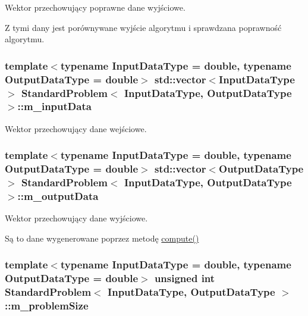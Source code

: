 Wektor przechowujący poprawne dane wyjściowe. 

Z tymi dany jest porównywane wyjście algorytmu i sprawdzana poprawność algorytmu. \hypertarget{class_standard_problem_ad1d5f039cd59372664a18ee57485252a}{
\subsubsection[{m\-\_\-input\-Data}]{\setlength{\rightskip}{0pt plus 5cm}template$<$typename Input\-Data\-Type = double, typename Output\-Data\-Type = double$>$ std\-::vector$<$Input\-Data\-Type$>$ {\bf Standard\-Problem}$<$ Input\-Data\-Type, Output\-Data\-Type $>$\-::m\-\_\-input\-Data\hspace{0.3cm}{\ttfamily [protected]}}}\label{class_standard_problem_ad1d5f039cd59372664a18ee57485252a}


Wektor przechowujący dane wejściowe. 

\hypertarget{class_standard_problem_a2ca81280f88e1d8091cacceae8f2e073}{
\subsubsection[{m\-\_\-output\-Data}]{\setlength{\rightskip}{0pt plus 5cm}template$<$typename Input\-Data\-Type = double, typename Output\-Data\-Type = double$>$ std\-::vector$<$Output\-Data\-Type$>$ {\bf Standard\-Problem}$<$ Input\-Data\-Type, Output\-Data\-Type $>$\-::m\-\_\-output\-Data\hspace{0.3cm}{\ttfamily [protected]}}}\label{class_standard_problem_a2ca81280f88e1d8091cacceae8f2e073}


Wektor przechowujący dane wyjściowe. 

Są to dane wygenerowane poprzez metodę \hyperlink{class_standard_problem_ad9d90f5c981806bed7c6b4a08abb0384}{compute()} \hypertarget{class_standard_problem_ae8fc195a5e90d5cf0dd6c0417654741a}{
\subsubsection[{m\-\_\-problem\-Size}]{\setlength{\rightskip}{0pt plus 5cm}template$<$typename Input\-Data\-Type = double, typename Output\-Data\-Type = double$>$ unsigned int {\bf Standard\-Problem}$<$ Input\-Data\-Type, Output\-Data\-Type $>$\-::m\-\_\-problem\-Size\hspace{0.3cm}{\ttfamily [private]}}}\label{class_standard_problem_ae8fc195a5e90d5cf0dd6c0417654741a}


